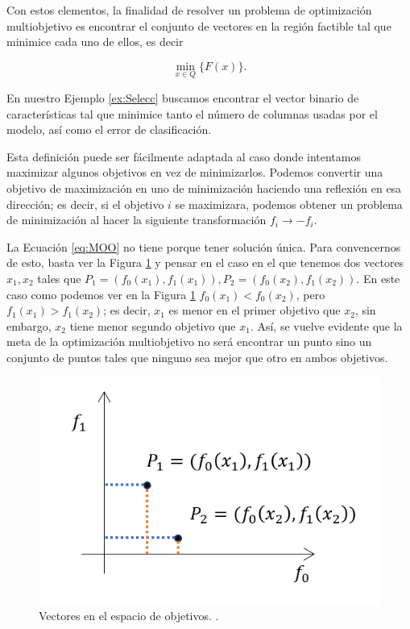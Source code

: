Con estos elementos, la finalidad de resolver un problema de optimización multiobjetivo es encontrar el conjunto de vectores en la región factible tal que minimice cada uno de ellos, es decir

\begin{equation} \label{eq:MOO}
    \min_{x\in Q} \{F(x)\}.
\end{equation}

En nuestro Ejemplo \ref{ex:Selecc} buscamos encontrar el vector binario de características tal que minimice tanto el número de columnas usadas por el modelo, así como el error de clasificación. 

Esta definición puede ser fácilmente adaptada al caso donde intentamos maximizar algunos objetivos en vez de minimizarlos. Podemos convertir una objetivo de maximización en uno de minimización haciendo una reflexión en esa dirección; es decir, si el objetivo $i$ se maximizara, podemos obtener un problema de minimización al hacer la siguiente transformación $f_i \rightarrow -f_i$. 

La Ecuación \eqref{eq:MOO} no tiene porque tener solución única. Para convencernos de esto, basta ver la Figura \ref{fig:pareto} y pensar en el caso en el que tenemos dos vectores $x_1, x_2$ tales que $P_1=(f_0(x_1),f_1(x_1)), P_2=(f_0(x_2),f_1(x_2))$. En este caso como podemos ver en la Figura \ref{fig:pareto} $f_0(x_1)< f_0(x_2)$, pero $f_1(x_1) > f_1(x_2)$; es decir, $x_1$ es menor en el primer objetivo que $x_2$, sin embargo, $x_2$ tiene menor segundo objetivo que $x_1$. Así, se vuelve evidente que la meta de la optimización multiobjetivo no será encontrar un punto sino un conjunto de puntos tales que ninguno sea mejor que otro en ambos objetivos.

\begin{figure}[H]
    \centering
    \includegraphics[scale=.5]{Figuras/pareto.png}
    \caption[Vectores en el espacio de objetivos]{Vectores en el espacio de objetivos. .}
    \label{fig:pareto}
\end{figure}


